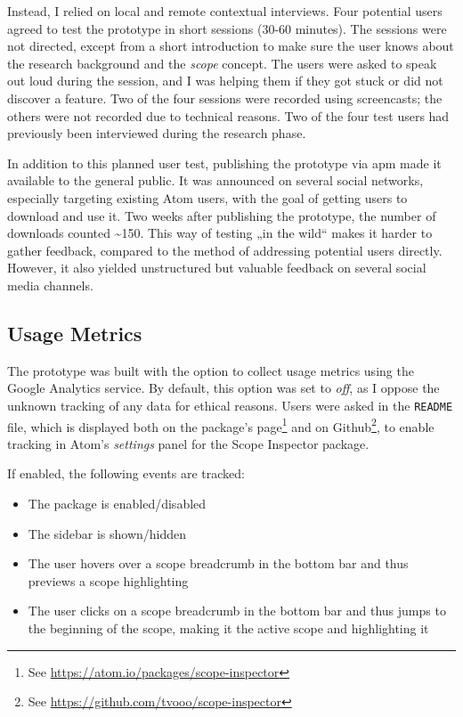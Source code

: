 Instead, I relied on local and remote contextual interviews. Four
potential users agreed to test the prototype in short sessions (30-60
minutes). The sessions were not directed, except from a short
introduction to make sure the user knows about the research background
and the \emph{scope} concept. The users were asked to speak out loud
during the session, and I was helping them if they got stuck or did not
discover a feature. Two of the four sessions were recorded using
screencasts; the others were not recorded due to technical reasons. Two
of the four test users had previously been interviewed during the
research phase.

In addition to this planned user test, publishing the prototype via
\ac{apm} made it available to the general public. It was announced on
several social networks, especially targeting existing Atom users, with
the goal of getting users to download and use it. Two weeks after
publishing the prototype, the number of downloads counted
\textasciitilde{}150. This way of testing „in the wild“ makes it harder
to gather feedback, compared to the method of addressing potential users
directly. However, it also yielded unstructured but valuable feedback on
several social media channels.

\subsection{Usage Metrics}\label{usage-metrics}

The prototype was built with the option to collect usage metrics using
the Google Analytics service. By default, this option was set to
\emph{off}, as I oppose the unknown tracking of any data for ethical
reasons. Users were asked in the \texttt{README} file, which is
displayed both on the package’s
page\footnote{See \url{https://atom.io/packages/scope-inspector}} and on
Github\footnote{See \url{https://github.com/tvooo/scope-inspector}}, to
enable tracking in Atom’s \emph{settings} panel for the Scope Inspector
package.

If enabled, the following events are tracked:

\begin{itemize}
\itemsep1pt\parskip0pt
\item
  The package is enabled/disabled
\item
  The sidebar is shown/hidden
\item
  The user hovers over a scope breadcrumb in the bottom bar and thus
  previews a scope highlighting
\item
  The user clicks on a scope breadcrumb in the bottom bar and thus jumps
  to the beginning of the scope, making it the active scope and
  highlighting it
\end{itemize}

